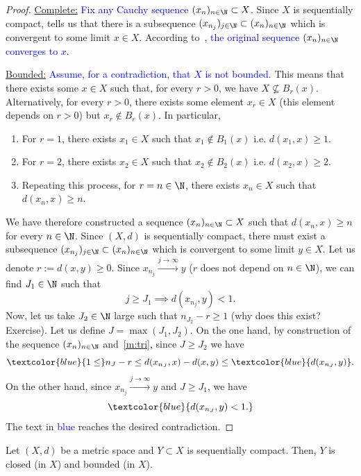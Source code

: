 \begin{proof}
\ul{Complete:} \textcolor{blue}{Fix any Cauchy sequence $(x_n)_{n\in\N}\subset X$.} Since $X$ is sequentially compact,  tells us that there is a subsequence $(x_{n_j})_{j\in\N}\subset (x_n)_{n\in\N}$ which is convergent to some limit $x\in X$. According to~, \textcolor{blue}{the original sequence $(x_n)_{n\in\N}$ converges to $x$}.

\ul{Bounded:} \textcolor{blue}{Assume, for a contradiction, that $X$ is not bounded.} This means that there exists some $x\in X$ such that, for every $r>0$, we have $X \nsubseteq B_r(x)$. Alternatively, for every $r>0$, there exists some element $x_r \in X$ (this element depends on $r>0$) but $x_r \notin B_r(x)$. In particular,
\begin{enumerate}
	\item For $r=1$, there exists $x_1 \in X$ such that $x_1 \notin B_1(x)$ i.e. $d(x_1,x)\ge 1$.
	\item For $r=2$, there exists $x_2 \in X$ such that $x_2 \notin B_2(x)$ i.e. $d(x_2,x) \ge 2$.
	\item Repeating this process, for $r = n\in\N$, there exists $x_n\in X$ such that $d(x_n,x)\ge n$.
\end{enumerate}
We have therefore constructed a sequence $(x_n)_{n\in \N}\subset X$ such that $d(x_n,x)\ge n$ for every $n\in\N$. Since $(X,d)$ is sequentially compact, there must exist a subsequence $(x_{n_j})_{j\in\N}\subset (x_n)_{n\in\N}$ which is convergent to some limit $y\in X$. Let us denote $r:= d(x,y)\ge 0$. Since $x_{n_j}\overset{j\to \infty}{\to} y$ ($r$ does not depend on $n\in\N$), we can find $J_1\in \N$ such that
\[
j\ge J_1 \implies d(x_{n_j},y)<1.
\]
Now, let us take $J_2\in\N$ large such that $n_{J_2} - r \ge 1$ (why does this exist? Exercise). Let us define $J = \max (J_1,J_2)$. On the one hand, by construction of the sequence $(x_n)_{n\in\N}$ and~\ref{m:tri}, since $J\ge J_2$ we have
\[
\textcolor{blue}{1\le} n_{J} - r \le d(x_{n_J},x) - d(x,y) \le  \textcolor{blue}{d(x_{n_J},y)}.
\]
On the other hand, since $x_{n_j}\overset{j\to \infty}{\to}y$ and $J \ge J_1$, we have
\[
\textcolor{blue}{d(x_{n_J},y)<1.}
\]
The text in \textcolor{blue}{blue} reaches the desired contradiction.
\end{proof}
\begin{cor}
\label{cor:seq_cpct_clos_bdd}
Let $(X,d)$ be a metric space and $Y\subset X$ is sequentially compact. Then, $Y$ is closed (in $X$) and bounded (in $X$).
\end{cor}
